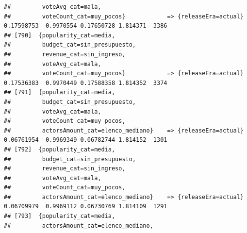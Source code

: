 \documentclass[
]{article}
\begin{document}
\begin{verbatim}
##         voteAvg_cat=mala,                                                                                                       
##         voteCount_cat=muy_pocos}            => {releaseEra=actual}               0.17598753  0.9970554 0.17650728 1.814371  3386
## [790]  {popularity_cat=media,                                                                                                   
##         budget_cat=sin_presupuesto,                                                                                             
##         revenue_cat=sin_ingreso,                                                                                                
##         voteAvg_cat=mala,                                                                                                       
##         voteCount_cat=muy_pocos}            => {releaseEra=actual}               0.17536383  0.9970449 0.17588358 1.814352  3374
## [791]  {popularity_cat=media,                                                                                                   
##         budget_cat=sin_presupuesto,                                                                                             
##         voteAvg_cat=mala,                                                                                                       
##         voteCount_cat=muy_pocos,                                                                                                
##         actorsAmount_cat=elenco_mediano}    => {releaseEra=actual}               0.06761954  0.9969349 0.06782744 1.814152  1301
## [792]  {popularity_cat=media,                                                                                                   
##         budget_cat=sin_presupuesto,                                                                                             
##         revenue_cat=sin_ingreso,                                                                                                
##         voteAvg_cat=mala,                                                                                                       
##         voteCount_cat=muy_pocos,                                                                                                
##         actorsAmount_cat=elenco_mediano}    => {releaseEra=actual}               0.06709979  0.9969112 0.06730769 1.814109  1291
## [793]  {popularity_cat=media,                                                                                                   
##         actorsAmount_cat=elenco_mediano,                                                                                        

\end{verbatim}
\end{document}
